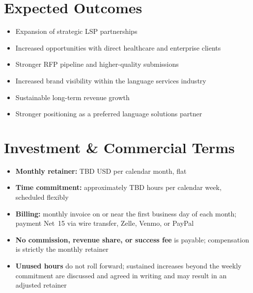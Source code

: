 \documentclass{toospoint}
\begin{document}
\section{Expected Outcomes}

\vspace{4pt}
\begin{mdframed}[
  linecolor=TPTeal,
  linewidth=1.2pt,
  roundcorner=4pt,
  backgroundcolor=TPLight,
  innerleftmargin=14pt,
  innerrightmargin=14pt,
  innertopmargin=10pt,
  innerbottommargin=10pt
]
\sffamily\small
\begin{itemize}[leftmargin=1.5em, itemsep=4pt, topsep=2pt]
  \item Expansion of strategic LSP partnerships
  \item Increased opportunities with direct healthcare and enterprise clients
  \item Stronger RFP pipeline and higher-quality submissions
  \item Increased brand visibility within the language services industry
  \item Sustainable long-term revenue growth
  \item Stronger positioning as a preferred language solutions partner
\end{itemize}
\end{mdframed}

\section{Investment \& Commercial Terms}

\begin{itemize}[leftmargin=1.5em, itemsep=4pt, topsep=4pt]
  \item \textbf{Monthly retainer:} TBD USD per calendar month, flat
  \item \textbf{Time commitment:} approximately TBD hours per calendar week, scheduled flexibly
  \item \textbf{Billing:} monthly invoice on or near the first business day of each month; payment Net~15 via wire transfer, Zelle, Venmo, or PayPal
  \item \textbf{No commission, revenue share, or success fee} is payable; compensation is strictly the monthly retainer
  \item \textbf{Unused hours} do not roll forward; sustained increases beyond the weekly commitment are discussed and agreed in writing and may result in an adjusted retainer
\end{itemize}
\end{document}
